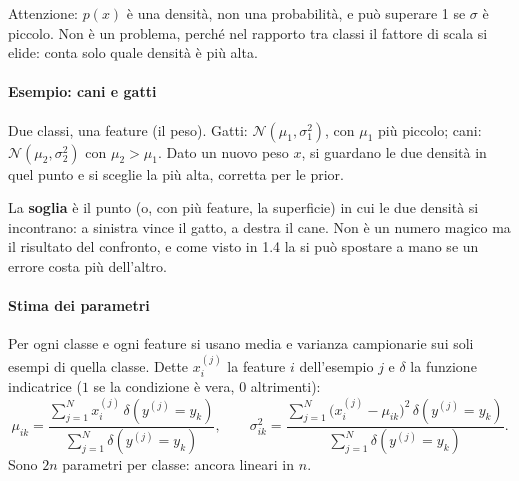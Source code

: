 \documentclass[12pt]{extarticle}
\begin{document}
\noindent Attenzione: $p(x)$ è una densità, non una probabilità, e può superare 1 se $\sigma$ è piccolo. Non è un problema, perché nel rapporto tra classi il fattore di scala si elide: conta solo quale densità è più alta.

\paragraph{Esempio: cani e gatti}
Due classi, una feature (il peso). Gatti: $\mathcal{N}(\mu_1,\sigma_1^2)$, con $\mu_1$ più piccolo; cani: $\mathcal{N}(\mu_2,\sigma_2^2)$ con $\mu_2>\mu_1$. Dato un nuovo peso $x$, si guardano le due densità in quel punto e si sceglie la più alta, corretta per le prior.

\begin{center}
\end{center}

\noindent La \textbf{soglia} è il punto (o, con più feature, la superficie) in cui le due densità si incontrano: a sinistra vince il gatto, a destra il cane. Non è un numero magico ma il risultato del confronto, e come visto in 1.4 la si può spostare a mano se un errore costa più dell'altro.

\paragraph{Stima dei parametri}
Per ogni classe e ogni feature si usano media e varianza campionarie sui soli esempi di quella classe. Dette $x_i^{(j)}$ la feature $i$ dell'esempio $j$ e $\delta$ la funzione indicatrice ($1$ se la condizione è vera, $0$ altrimenti):
\[
\mu_{ik} = \frac{\sum_{j=1}^N x_i^{(j)}\,\delta(y^{(j)}=y_k)}{\sum_{j=1}^N \delta(y^{(j)}=y_k)},
\qquad
\sigma_{ik}^2 = \frac{\sum_{j=1}^N \big(x_i^{(j)}-\mu_{ik}\big)^2\,\delta(y^{(j)}=y_k)}{\sum_{j=1}^N \delta(y^{(j)}=y_k)} .
\]
Sono $2n$ parametri per classe: ancora lineari in $n$.
\end{document}
